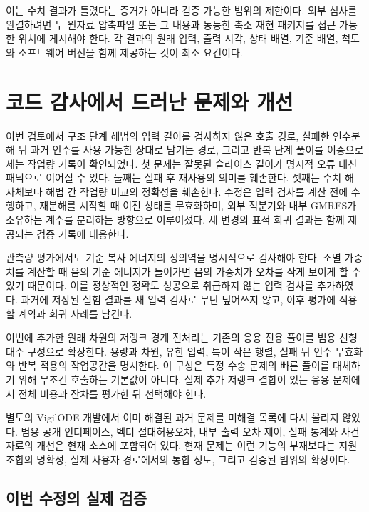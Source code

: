 \documentclass[
  10pt,
  a4paper,
]{article}
\begin{document}
이는 수치 결과가 틀렸다는 증거가 아니라 검증 가능한 범위의 제한이다.
외부 심사를 완결하려면 두 원자료 압축파일 또는 그 내용과 동등한 축소
재현 패키지를 접근 가능한 위치에 게시해야 한다. 각 결과의 원래 입력,
출력 시각, 상태 배열, 기준 배열, 척도와 소프트웨어 버전을 함께 제공하는
것이 최소 요건이다.

\hypertarget{uxcf54uxb4dc-uxac10uxc0acuxc5d0uxc11c-uxb4dcuxb7ecuxb09c-uxbb38uxc81cuxc640-uxac1cuxc120}{%
\section{코드 감사에서 드러난 문제와
개선}\label{uxcf54uxb4dc-uxac10uxc0acuxc5d0uxc11c-uxb4dcuxb7ecuxb09c-uxbb38uxc81cuxc640-uxac1cuxc120}}

이번 검토에서 구조 단계 해법의 입력 길이를 검사하지 않은 호출 경로,
실패한 인수분해 뒤 과거 인수를 사용 가능한 상태로 남기는 경로, 그리고
반복 단계 풀이를 이중으로 세는 작업량 기록이 확인되었다. 첫 문제는
잘못된 슬라이스 길이가 명시적 오류 대신 패닉으로 이어질 수 있다. 둘째는
실패 후 재사용의 의미를 훼손한다. 셋째는 수치 해 자체보다 해법 간 작업량
비교의 정확성을 훼손한다. 수정은 입력 검사를 계산 전에 수행하고,
재분해를 시작할 때 이전 상태를 무효화하며, 외부 적분기와 내부 GMRES가
소유하는 계수를 분리하는 방향으로 이루어졌다. 세 변경의 표적 회귀 결과는
함께 제공되는 검증 기록에 대응한다.

관측량 평가에서도 기준 복사 에너지의 정의역을 명시적으로 검사해야 한다.
소멸 가중치를 계산할 때 음의 기준 에너지가 들어가면 음의 가중치가 오차를
작게 보이게 할 수 있기 때문이다. 이를 정상적인 정확도 성공으로 취급하지
않는 입력 검사를 추가하였다. 과거에 저장된 실험 결과를 새 입력 검사로
무단 덮어쓰지 않고, 이후 평가에 적용할 계약과 회귀 사례를 남긴다.

이번에 추가한 원래 차원의 저랭크 경계 전처리는 기존의 응용 전용 풀이를
범용 선형대수 구성으로 확장한다. 용량과 차원, 유한 입력, 특이 작은 행렬,
실패 뒤 인수 무효화와 반복 적용의 작업공간을 명시한다. 이 구성은 특정
수송 문제의 빠른 풀이를 대체하기 위해 무조건 호출하는 기본값이 아니다.
실제 추가 저랭크 결합이 있는 응용 문제에서 전체 비용과 잔차를 평가한 뒤
선택해야 한다.

별도의 VigilODE 개발에서 이미 해결된 과거 문제를 미해결 목록에 다시
올리지 않았다. 범용 공개 인터페이스, 벡터 절대허용오차, 내부 출력 오차
제어, 실패 통계와 사건 자료의 개선은 현재 소스에 포함되어 있다. 현재
문제는 이런 기능의 부재보다는 지원 조합의 명확성, 실제 사용자 경로에서의
통합 정도, 그리고 검증된 범위의 확장이다.

\hypertarget{uxc774uxbc88-uxc218uxc815uxc758-uxc2e4uxc81c-uxac80uxc99d}{%
\subsection{이번 수정의 실제
검증}\label{uxc774uxbc88-uxc218uxc815uxc758-uxc2e4uxc81c-uxac80uxc99d}}
\end{document}
